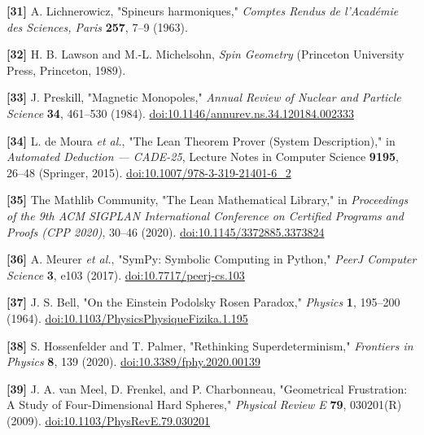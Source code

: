 \documentclass[a4paper,11pt]{article}
\begin{document}
\label{ref31}
\noindent \textbf{[31]} A. Lichnerowicz, "Spineurs harmoniques," \textit{Comptes Rendus de l'Académie des Sciences, Paris} \textbf{257}, 7–9 (1963).


\label{ref32}
\noindent \textbf{[32]} H. B. Lawson and M.-L. Michelsohn, \textit{Spin Geometry} (Princeton University Press, Princeton, 1989).


\label{ref33}
\noindent \textbf{[33]} J. Preskill, "Magnetic Monopoles," \textit{Annual Review of Nuclear and Particle Science} \textbf{34}, 461–530 (1984). \href{https://doi.org/10.1146/annurev.ns.34.120184.002333}{doi:10.1146/annurev.ns.34.120184.002333}


\label{ref34}
\noindent \textbf{[34]} L. de Moura \textit{et al.}, "The Lean Theorem Prover (System Description)," in \textit{Automated Deduction — CADE-25}, Lecture Notes in Computer Science \textbf{9195}, 26–48 (Springer, 2015). \href{https://doi.org/10.1007/978-3-319-21401-6_2}{doi:10.1007/978-3-319-21401-6\_2}


\label{ref35}
\noindent \textbf{[35]} The Mathlib Community, "The Lean Mathematical Library," in \textit{Proceedings of the 9th ACM SIGPLAN International Conference on Certified Programs and Proofs (CPP 2020)}, 30–46 (2020). \href{https://doi.org/10.1145/3372885.3373824}{doi:10.1145/3372885.3373824}


\label{ref36}
\noindent \textbf{[36]} A. Meurer \textit{et al.}, "SymPy: Symbolic Computing in Python," \textit{PeerJ Computer Science} \textbf{3}, e103 (2017). \href{https://doi.org/10.7717/peerj-cs.103}{doi:10.7717/peerj-cs.103}


\label{ref37}
\noindent \textbf{[37]} J. S. Bell, "On the Einstein Podolsky Rosen Paradox," \textit{Physics} \textbf{1}, 195–200 (1964). \href{https://doi.org/10.1103/PhysicsPhysiqueFizika.1.195}{doi:10.1103/PhysicsPhysiqueFizika.1.195}


\label{ref38}
\noindent \textbf{[38]} S. Hossenfelder and T. Palmer, "Rethinking Superdeterminism," \textit{Frontiers in Physics} \textbf{8}, 139 (2020). \href{https://doi.org/10.3389/fphy.2020.00139}{doi:10.3389/fphy.2020.00139}


\label{ref39}
\noindent \textbf{[39]} J. A. van Meel, D. Frenkel, and P. Charbonneau, "Geometrical Frustration: A Study of Four-Dimensional Hard Spheres," \textit{Physical Review E} \textbf{79}, 030201(R) (2009). \href{https://doi.org/10.1103/PhysRevE.79.030201}{doi:10.1103/PhysRevE.79.030201}
\end{document}
